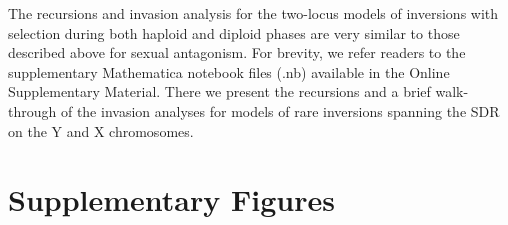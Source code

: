 \documentclass{article}
\begin{document}
The recursions and invasion analysis for the two-locus models of inversions with selection during both haploid and diploid phases are very similar to those described above for sexual antagonism. For brevity, we refer readers to the supplementary Mathematica notebook files (.nb) available in the Online Supplementary Material. There we present the recursions and a brief walk-through of the invasion analyses for models of rare inversions spanning the SDR on the Y and X chromosomes.






 \section{Supplementary Figures} \label{AppD}
 \renewcommand{\theequation}{D\arabic{equation}}
 \setcounter{equation}{0}
 \renewcommand{\thefigure}{S\arabic{figure}}
 \setcounter{figure}{0}
\end{document}
